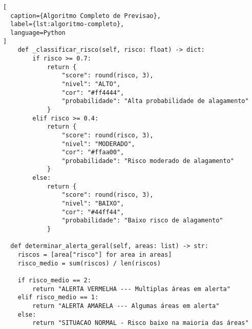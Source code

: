 \begin{apendicesenv}
\begin{lstlisting}[
  caption={Algoritmo Completo de Previsao},
  label={lst:algoritmo-completo},
  language=Python
]
    def _classificar_risco(self, risco: float) -> dict:
        if risco >= 0.7:
            return {
                "score": round(risco, 3),
                "nivel": "ALTO",
                "cor": "#ff4444",
                "probabilidade": "Alta probabilidade de alagamento"
            }
        elif risco >= 0.4:
            return {
                "score": round(risco, 3),
                "nivel": "MODERADO",
                "cor": "#ffaa00",
                "probabilidade": "Risco moderado de alagamento"
            }
        else:
            return {
                "score": round(risco, 3),
                "nivel": "BAIXO",
                "cor": "#44ff44",
                "probabilidade": "Baixo risco de alagamento"
            }

  def determinar_alerta_geral(self, areas: list) -> str:
    riscos = [area["risco"] for area in areas]
    risco_medio = sum(riscos) / len(riscos)

    if risco_medio == 2:
        return "ALERTA VERMELHA --- Multiplas áreas em alerta"
    elif risco_medio == 1:
        return "ALERTA AMARELA --- Algumas áreas em alerta"
    else:
        return "SITUACAO NORMAL - Risco baixo na maioria das áreas"

\end{lstlisting}

\end{apendicesenv}

